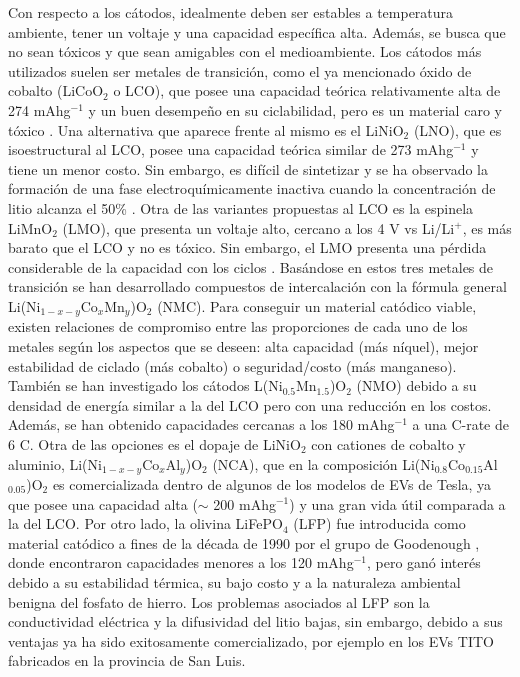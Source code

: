 Con respecto a los cátodos, idealmente deben ser estables a temperatura ambiente,
tener un voltaje y una capacidad específica alta. Además, se busca que no sean 
tóxicos y que sean amigables con el medioambiente. Los cátodos más utilizados 
suelen ser metales de transición, como el ya mencionado óxido de cobalto 
(LiCoO$_2$ o LCO), que posee una capacidad teórica relativamente alta de 274 mAhg$^{-1}$ y un buen desempeño en su ciclabilidad, pero es un
material caro y tóxico \cite{akhilash2021}. Una alternativa que aparece frente
al mismo es el LiNiO$_2$ (LNO), que es isoestructural al LCO, posee una
capacidad teórica similar de 273 mAhg$^{-1}$ y tiene un menor costo. Sin embargo, es
difícil de sintetizar y se ha observado la formación de una fase 
electroquímicamente inactiva cuando la concentración de litio alcanza el 50\% 
\cite{bianchini2019}. Otra de las variantes propuestas al LCO es la espinela
LiMnO$_2$ (LMO), que presenta un voltaje alto, cercano a los 4 V vs Li/Li$^+$,
es más barato que el LCO y no es tóxico. Sin embargo, el LMO presenta una 
pérdida considerable de la capacidad con los ciclos \cite{bhandari2016}. Basándose en estos 
tres metales de transición se han desarrollado compuestos de intercalación con 
la fórmula general Li(Ni$_{1-x-y}$Co$_x$Mn$_y$)O$_2$ (NMC). Para conseguir un 
material catódico viable, existen relaciones de compromiso entre las proporciones de cada uno de 
los metales según los aspectos que se deseen: alta capacidad (más níquel), 
mejor estabilidad de ciclado (más cobalto) o seguridad/costo (más manganeso). 
También se han investigado los cátodos L(Ni$_{0.5}$Mn$_{1.5}$)O$_2$ (NMO) debido
a su densidad de energía similar a la del LCO pero con una reducción en los costos.
Además, se han obtenido capacidades cercanas a los 180 mAhg$^{-1}$ a una C-rate de 6 C.
Otra de las opciones es el dopaje de LiNiO$_2$ con cationes de cobalto y aluminio, 
Li(Ni$_{1-x-y}$Co$_x$Al$_y$)O$_2$ (NCA), que en la composición 
Li(Ni$_{0.8}$Co$_{0.15}$Al$_{0.05}$)O$_2$ \cite{chen2004} es comercializada 
dentro de algunos de los modelos de EVs de Tesla, ya que posee una capacidad alta ($\sim$ 200 mAhg$^{-1}$) y una gran vida útil comparada a la del LCO. Por otro lado, la olivina 
LiFePO$_4$ (LFP) fue introducida como material catódico a fines de la década 
de 1990 por el grupo de Goodenough \cite{padhi1997}, donde encontraron capacidades
menores a los 120 mAhg$^{-1}$, pero ganó interés debido a su estabilidad térmica, su bajo costo y a la 
naturaleza ambiental benigna del fosfato de hierro. Los problemas asociados al LFP son la
conductividad eléctrica y la difusividad del litio bajas, sin embargo, debido
a sus ventajas ya ha sido exitosamente comercializado, por ejemplo en los EVs 
TITO fabricados en la provincia de San Luis.

